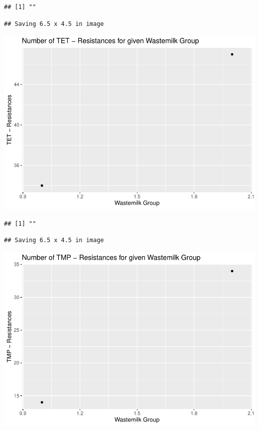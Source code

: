 \documentclass[
]{article}
\begin{document}
\begin{verbatim}
## [1] ""
\end{verbatim}

\begin{verbatim}
## Saving 6.5 x 4.5 in image
\end{verbatim}

\includegraphics{NResistenzen_files/figure-latex/binary_or_nominal_variables-8.pdf}

\begin{verbatim}
## [1] ""
\end{verbatim}

\begin{verbatim}
## Saving 6.5 x 4.5 in image
\end{verbatim}

\includegraphics{NResistenzen_files/figure-latex/binary_or_nominal_variables-9.pdf}
\end{document}
